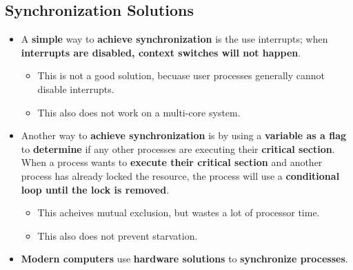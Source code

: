 \documentclass{article}
\begin{document}
\subsection*{Synchronization Solutions}
\begin{itemize}
    \item A \textbf{simple} way to \textbf{achieve synchronization} is the use interrupts; when \textbf{interrupts are disabled, context switches will not happen}.
    \begin{itemize}
        \item This is not a good solution, becuase user processes generally cannot disable interrupts.
        \item This also does not work on a multi-core system.
    \end{itemize}
    \item Another way to \textbf{achieve synchronization} is by using a \textbf{variable as a flag} to \textbf{determine} if any other processes are executing their \textbf{critical section}. When a process wants to \textbf{execute their critical section} and another process has already locked the resource, the process will use a \textbf{conditional loop until the lock is removed}.
    \begin{itemize}
        \item This acheives mutual exclusion, but wastes a lot of processor time.
        \item This also does not prevent starvation.
    \end{itemize}
    \item \textbf{Modern computers} use \textbf{hardware solutions} to \textbf{synchronize processes}.
\end{itemize}

\section*{}
\end{document}
